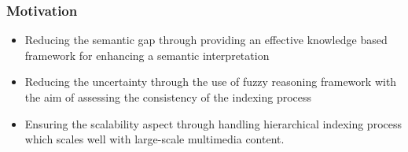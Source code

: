 		\begin{frame}
			\frametitle{Motivation}
			\begin{itemize}
				\item Reducing the semantic gap through providing an \alert{effective knowledge based 
					framework for enhancing a semantic interpretation}
				\item Reducing the uncertainty through the use of \alert{fuzzy reasoning framework}
					with the aim of assessing the consistency of the indexing process
				\item Ensuring the \alert{scalability} aspect through handling hierarchical 
					indexing process which scales well with large-scale multimedia content.
			\end{itemize}	
		\end{frame}
